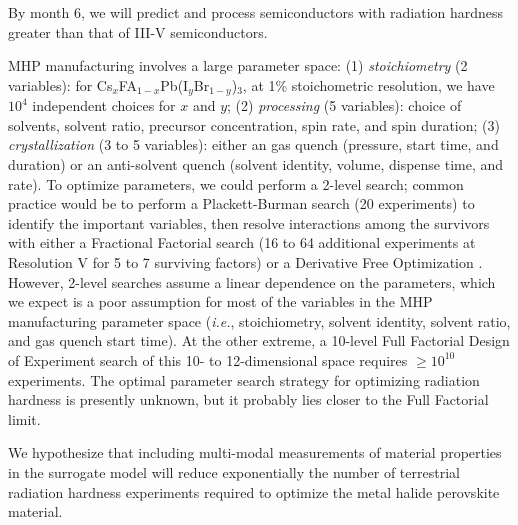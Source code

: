 \documentclass[pgs]{DOE}
\begin{document}
\begin{tcolorbox}[
    width=4.25in,
    center,
    colframe=gray,
    colback=gray!10,
    coltext=black]
    
    By month 6, we will predict and process semiconductors with radiation hardness greater than that of III-V semiconductors.
\end{tcolorbox}

MHP manufacturing involves a large parameter space: 
(1) \emph{stoichiometry} (2 variables): for Cs$_x$FA$_{1-x}$Pb(I$_{y}$Br$_{1-y}$)$_3$, at 1\% stoichometric resolution, we have $10^4$ independent choices for $x$ and $y$; 
(2) \emph{processing} (5 variables): choice of solvents, solvent ratio, precursor concentration, spin rate, and spin duration; 
(3) \emph{crystallization} (3 to 5 variables): either an  gas quench (pressure, start time, and duration) or an anti-solvent quench (solvent identity, volume, dispense time, and rate). 
To optimize parameters, we could perform a 2-level search; common practice would be to perform a Plackett-Burman search \cite{Plackett1946jun} (20 experiments) to identify the important variables, then resolve interactions among the survivors with either a Fractional Factorial search \cite{Box1961aug} (16 to 64 additional experiments at Resolution V for 5 to 7 surviving factors) or a Derivative Free Optimization \cite{Oh2025dec}.
However, 2-level searches assume a linear dependence on the parameters, which we expect is a poor assumption for most of the variables in the MHP manufacturing parameter space (\emph{i.e.}, stoichiometry, solvent identity, solvent ratio, and  gas quench start time).
At the other extreme, a 10-level Full Factorial Design of Experiment search \cite{Lamberti2022mar} of this 10- to 12-dimensional space requires $\geq 10^{10}$ experiments.
The optimal parameter search strategy for optimizing radiation hardness is presently unknown, but it probably lies closer to the Full Factorial limit. 

\begin{tcolorbox}[
    width=5.50in,
    center,
    colframe=gray,
    colback=gray!10,
    coltext=black]
    
    We hypothesize that including multi-modal measurements of material properties in the surrogate model will reduce exponentially the number of terrestrial radiation hardness experiments required to optimize the metal halide perovskite material.
\end{tcolorbox}
\end{document}
